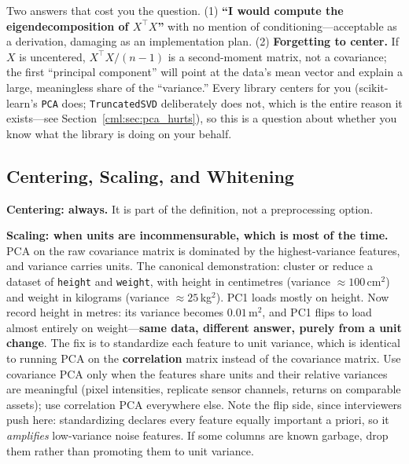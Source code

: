 \begin{warningbox}
Two answers that cost you the question. (1) \textbf{``I would compute the eigendecomposition of $X^\top X$''} with no mention of conditioning---acceptable as a derivation, damaging as an implementation plan. (2) \textbf{Forgetting to center.} If $X$ is uncentered, $X^\top X/(n-1)$ is a second-moment matrix, not a covariance; the first ``principal component'' will point at the data's mean vector and explain a large, meaningless share of the ``variance.'' Every library centers for you (scikit-learn's \texttt{PCA} does; \texttt{TruncatedSVD} deliberately does not, which is the entire reason it exists---see Section~\ref{cml:sec:pca_hurts}), so this is a question about whether you know what the library is doing on your behalf.
\end{warningbox}

\subsection{Centering, Scaling, and Whitening}

\textbf{Centering: always.} It is part of the definition, not a preprocessing option.

\textbf{Scaling: when units are incommensurable, which is most of the time.} PCA on the raw covariance matrix is dominated by the highest-variance features, and variance carries units. The canonical demonstration: cluster or reduce a dataset of \texttt{height} and \texttt{weight}, with height in centimetres (variance $\approx 100$\,cm$^2$) and weight in kilograms (variance $\approx 25$\,kg$^2$). PC1 loads mostly on height. Now record height in metres: its variance becomes $0.01$\,m$^2$, and PC1 flips to load almost entirely on weight---\textbf{same data, different answer, purely from a unit change}. The fix is to standardize each feature to unit variance, which is identical to running PCA on the \textbf{correlation} matrix instead of the covariance matrix. Use covariance PCA only when the features share units and their relative variances are meaningful (pixel intensities, replicate sensor channels, returns on comparable assets); use correlation PCA everywhere else. Note the flip side, since interviewers push here: standardizing declares every feature equally important a priori, so it \emph{amplifies} low-variance noise features. If some columns are known garbage, drop them rather than promoting them to unit variance.

